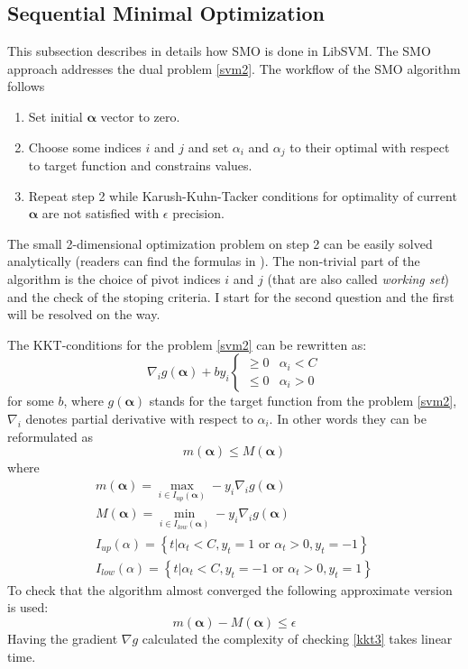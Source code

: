 \subsection{Sequential Minimal Optimization}
This subsection describes in details how SMO is done in LibSVM.
The SMO approach addresses the dual problem \ref{svm2}. The workflow of the SMO algorithm follows
\begin{enumerate}
\item
Set initial $\bm{\alpha}$ vector to zero. 
\item
Choose some indices $i$ and $j$ and set $\alpha_i$ and $\alpha_j$ to their optimal with respect to target function and constrains values.
\item
Repeat step 2 while Karush-Kuhn-Tacker conditions for optimality of current $\bm{\alpha}$ are not satisfied with $\epsilon$ precision.
\end{enumerate}
The small 2-dimensional optimization problem on step 2 can be easily solved analytically (readers can find the formulas in \cite{chang2011libsvm}). The non-trivial part of the algorithm is the choice of pivot indices $i$ and $j$ (that are also called \textit{working set}) and the check of the stoping criteria. I start for the second question and the first will be resolved on the way.

The KKT-conditions for the problem \ref{svm2} can be rewritten as:
\begin{equation}
\nabla_i g(\bm{\alpha}) + b y_i 
\left\{
\begin{array}{cc} 
\geq 0 & \alpha_i < C \\
\leq 0 & \alpha_i > 0
\end{array}
\right.
\label{kkt1}
\end{equation}
for some $b$, where $g(\bm{\alpha})$ stands for the target function from the problem \ref{svm2}, $\nabla_i$ denotes partial derivative with respect to $\alpha_i$. In other words  they can be reformulated as 
\begin{equation}
m(\bm{\alpha}) \leq M(\bm{\alpha})	
\label{kkt2}
\end{equation}
where
\begin{eqnarray}
m(\bm{\alpha}) = \underset{i \in I_{up}(\bm{\alpha})}{\max} -y_i \nabla_i g(\bm{\alpha}) \\
M(\bm{\alpha}) = \underset{i \in I_{low}(\bm{\alpha})}{\min} -y_i \nabla_i g(\bm{\alpha}) \\
I_{up}(\alpha) = 
\left\{
t|\alpha_t < C, y_t = 1 \textrm{ or }  \alpha_t > 0, y_t = -1
\right\} \\
I_{low}(\alpha) =
\left\{
t|\alpha_t < C, y_t = -1 \textrm{ or } \alpha_t > 0, y_t = 1 
\right\}
\end{eqnarray}
To check that the algorithm almost converged the following approximate version is used:
\begin{equation}
m(\bm{\alpha}) - M(\bm{\alpha}) \leq \epsilon
\label{kkt3}
\end{equation}
Having the gradient $\nabla g$ calculated the complexity of checking \ref{kkt3} takes linear time.

